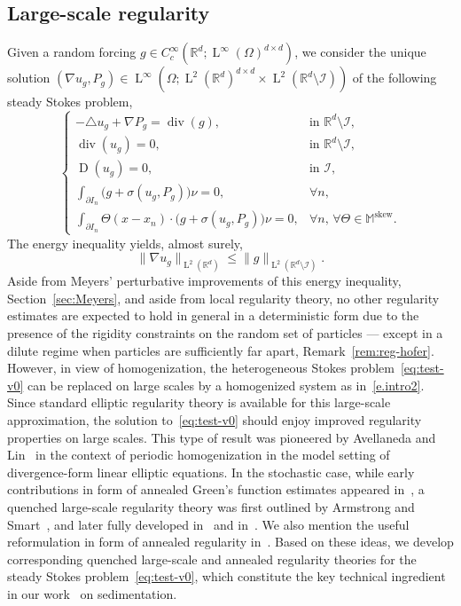\documentclass[10pt]{amsart}
\let\mathcal\mathscr
\theoremstyle{plain}
\theoremstyle{definition}
\newcommand{\R}{\mathbb R}
\newcommand{\Ic}{\mathcal I}
\newcommand{\Md}{\mathbb M}
\newcommand{\D}{\operatorname{D}}
\newcommand{\Ld}{\operatorname{L}}
\newcommand{\Div}{{\operatorname{div}}}
\newcommand{\Skew}{{\operatorname{skew}}}
\begin{document}
\subsection{Large-scale regularity}\label{sec:reg0}
Given a random forcing $g\in C^\infty_c(\R^d;\Ld^\infty(\Omega)^{d\times d})$, we consider the unique solution $(\nabla u_g,P_g)\in\Ld^\infty(\Omega;\Ld^2(\R^d)^{d\times d}\times\Ld^2(\R^d\setminus\Ic))$ of the following steady Stokes problem,
\begin{equation}\label{eq:test-v0}
\begin{cases}
-\triangle u_g+\nabla P_g=\Div (g),&\text{in $\R^d\setminus\Ic$},\\
\Div(u_g)=0,&\text{in $\R^d\setminus\Ic$},\\
\D(u_g)=0,&\text{in $\Ic$},\\
\int_{\partial I_{n}}\big(g+\sigma(u_g,P_g)\big)\nu=0,&\forall n,\\
\int_{\partial I_{n}}\Theta(x-x_n)\cdot\big(g+\sigma(u_g,P_g)\big)\nu=0,&\forall n,\,\forall\Theta\in\Md^\Skew.
\end{cases}
\end{equation}
The energy inequality yields, almost surely,
\begin{equation}\label{eq:energy}
\|\nabla u_g\|_{\Ld^2(\R^d)}\le\|g\|_{\Ld^2(\R^d\setminus\Ic)}.
\end{equation}
Aside from Meyers' perturbative improvements of this energy inequality, \cf Section~\ref{sec:Meyers}, and aside from local regularity theory, no other regularity estimates are expected to hold in general in a deterministic form due to the presence of the rigidity constraints on the random set of particles --- except in a dilute regime when particles are sufficiently far apart, \cf Remark~\ref{rem:reg-hofer}.
However, in view of homogenization, the heterogeneous Stokes problem~\eqref{eq:test-v0} can be replaced on large scales by a homogenized system as in~\eqref{e.intro2}.
Since standard elliptic regularity theory is available for this large-scale approximation, the solution to~\eqref{eq:test-v0} should enjoy improved regularity properties on large scales.
This type of result was pioneered by Avellaneda and Lin~\cite{Avellaneda-Lin-87,Avellaneda-Lin-91} in the context of periodic homogenization in the model setting of divergence-form linear elliptic equations.
In the stochastic case, while early contributions in form of annealed Green's function estimates appeared in~\cite{Delmotte-Deuschel-05,MaO}, a quenched large-scale regularity theory was first outlined by Armstrong and Smart~\cite{AS}, and later fully developed in~\cite{AM-16,AKM1,AKM2,AKM-book} and in~\cite{GNO-reg,GNO-quant,GO4}.
We also mention the useful reformulation in form of annealed regularity in~\cite{DO1}.
Based on these ideas, we develop corresponding quenched large-scale and annealed regularity theories for the steady Stokes problem~\eqref{eq:test-v0}, which constitute the key technical ingredient in our work~\cite{DG-20} on sedimentation.
\end{document}
